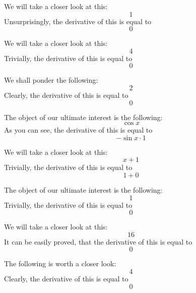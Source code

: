 \documentclass{article}
\begin{document}
We will take a closer look at this:
\begin{equation}
1 
\end{equation}
Unsurprisingly, the derivative of this is equal to
\begin{equation}
0 
\end{equation}

We will take a closer look at this:
\begin{equation}
4 
\end{equation}
Trivially, the derivative of this is equal to
\begin{equation}
0 
\end{equation}

We shall ponder the following:
\begin{equation}
2 
\end{equation}
Clearly, the derivative of this is equal to
\begin{equation}
0 
\end{equation}

The object of our ultimate interest is the following:
\begin{equation}
\cos x 
\end{equation}
As you can see, the derivative of this is equal to
\begin{equation}
-\sin x \cdot 1 
\end{equation}

We will take a closer look at this:
\begin{equation}
x + 1 
\end{equation}
Trivially, the derivative of this is equal to
\begin{equation}
1 + 0 
\end{equation}

The object of our ultimate interest is the following:
\begin{equation}
1 
\end{equation}
Trivially, the derivative of this is equal to
\begin{equation}
0 
\end{equation}

We will take a closer look at this:
\begin{equation}
16 
\end{equation}
It can be easily proved, that the derivative of this is equal to
\begin{equation}
0 
\end{equation}

The following is worth a closer look:
\begin{equation}
4 
\end{equation}
Clearly, the derivative of this is equal to
\begin{equation}
0 
\end{equation}
\end{document}
